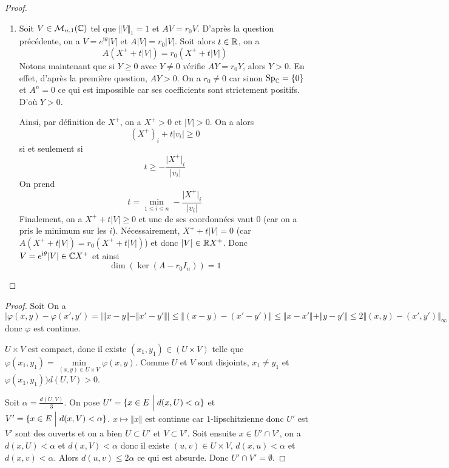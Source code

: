 \begin{proof}
\begin{enumerate}
		\item Soit $V\in\mathcal{M}_{n,1}(\mathbb{C})$ tel que $\Vert V\Vert_{1}=1$ et $AV=r_{0}V$. D'après la question précédente, on a $V=e^{\mathrm{i}\theta}\vert V\vert$ et $A\vert V\vert=r_{0}\vert V\vert$. Soit alors $t\in\mathbb{R}$, on a 
		\begin{equation}A(X^{+}+t\vert V\vert)=r_{0}(X^{+}+t\vert V\vert)\end{equation}
		Notons maintenant que si $Y\geqslant0$ avec $Y\neq0$ vérifie $AY=r_{0}Y$, alors $Y>0$. En effet, d'après la première question, $AY>0$. On a $r_{0}\neq0$ car sinon $\operatorname{Sp}_{\mathbb{C}}=\{0\}$ et $A^{n}=0$ ce qui est impossible car ses coefficients sont strictement positifs. D'où $Y>0$.

		Ainsi, par définition de $X^{+}$, on a $X^{+}>0$ et $\vert V\vert>0$. On a alors 
		\begin{equation}(X^{+})_{i}+t\vert v_{i}\vert\geqslant0\end{equation}
		si et seulement si
		\begin{equation}t\geqslant -\frac{\vert X^{+}\vert_{i}}{\vert v_{i}\vert}\end{equation}
		On prend 
		\begin{equation}t=\min\limits_{1\leqslant i\leqslant n}-\frac{\vert X^{+}\vert_{i}}{\vert v_{i}\vert}\end{equation}
		Finalement, on a $X^{+}+t\vert V\vert\geqslant0$ et une de ses coordonnées vaut 0 (car on a pris le minimum sur les $i$). Nécessairement, $X^{+}+t\vert V\vert=0$ (car $A(X^{+}+t\vert V\vert)=r_{0}(X^{+}+t\vert V\vert)$) et donc $\vert V\vert\in\mathbb{R} X^{+}$. Donc $V=e^{\mathrm{i}\theta}\vert V\vert\in\mathbb{C} X^{+}$ et ainsi 
		\begin{equation}\dim(\ker(A-r_{0}I_{n}))=1\end{equation}
	\end{enumerate}
\end{proof}

\begin{proof}
	Soit 
	On a 
	\begin{equation}\vert\varphi(x,y)-\varphi(x',y')=\vert\Vert x-y\Vert-\Vert x'-y'\Vert\vert\leqslant\Vert (x-y)-(x'-y')\Vert\leqslant\Vert x-x'\Vert+\Vert y-y'\Vert\leqslant2\Vert(x,y)-(x',y')\Vert_{\infty}\end{equation}
	donc $\varphi$ est continue.

	$U\times V$ est compact, donc il existe $(x_{1},y_{1})\in(U\times V)$ telle que $\varphi(x_{1},y_{1})=\min\limits_{(x,y)\in U\times V}\varphi(x,y)$. Comme $U$ et $V$ sont disjoints, $x_{1}\neq y_{1}$ et $\varphi(x_{1},y_{1}))d(U,V)>0$.

	Soit $\alpha=\frac{d(U,V)}{3}$. On pose $U'=\{x\in E\Bigm|d(x,U)<\alpha\}$ et $V'=\{x\in E\Bigm|d(x,V)<\alpha\}$. $x\mapsto\Vert x\Vert$ est continue car $1$-lipschitzienne donc $U'$ est $V'$ sont des ouverts et on a bien $U\subset U'$ et $V\subset V'$. Soit ensuite $x\in U'\cap V'$, on a $d(x,U)<\alpha$ et $d(x,V)<\alpha$ donc il existe $(u,v)\in U\times V$, $d(x,u)<\alpha$ et $d(x,v)<\alpha$. Alors $d(u,v)\leqslant2\alpha$ ce qui est absurde. Donc $U'\cap V'=\emptyset$.
\end{proof}

